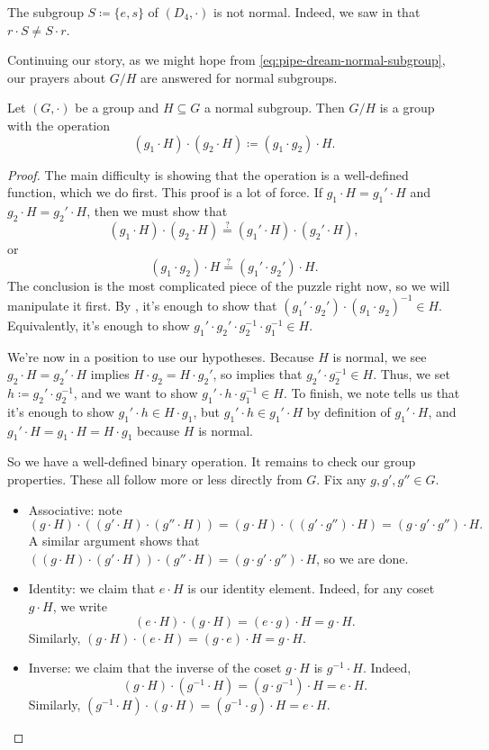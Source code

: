 \documentclass[../main.tex]{subfiles}
\begin{document}
\begin{nex}
    The subgroup $S\coloneqq\{e,s\}$ of $(D_4,\cdot)$ is not normal. Indeed, we saw in  that $r\cdot S\ne S\cdot r$.
\end{nex}
Continuing our story, as we might hope from \eqref{eq:pipe-dream-normal-subgroup}, our prayers about $G/H$ are answered for normal subgroups.
\begin{proposition}
    Let $(G,\cdot)$ be a group and $H\subseteq G$ a normal subgroup. Then $G/H$ is a group with the operation
    \[(g_1\cdot H)\cdot(g_2\cdot H)\coloneqq(g_1\cdot g_2)\cdot H.\]
\end{proposition}
\begin{proof}
    The main difficulty is showing that the operation is a well-defined function, which we do first. This proof is a lot of force. If $g_1\cdot H=g_1'\cdot H$ and $g_2\cdot H=g_2'\cdot H$, then we must show that
    \[(g_1\cdot H)\cdot(g_2\cdot H)\stackrel?=(g_1'\cdot H)\cdot(g_2'\cdot H),\]
    or
    \[(g_1\cdot g_2)\cdot H\stackrel?=(g_1'\cdot g_2')\cdot H.\]
    The conclusion is the most complicated piece of the puzzle right now, so we will manipulate it first. By , it's enough to show that $(g_1'\cdot g_2')\cdot(g_1\cdot g_2)^{-1}\in H$. Equivalently, it's enough to show $g_1'\cdot g_2'\cdot g_2^{-1}\cdot g_1^{-1}\in H$.
    
    We're now in a position to use our hypotheses. Because $H$ is normal, we see $g_2\cdot H=g_2'\cdot H$ implies $H\cdot g_2=H\cdot g_2'$, so  implies that $g_2'\cdot g_2^{-1}\in H$. Thus, we set $h\coloneqq g_2'\cdot g_2^{-1}$, and we want to show $g_1'\cdot h\cdot g_1^{-1}\in H$. To finish, we note  tells us that it's enough to show $g_1'\cdot h\in H\cdot g_1$, but $g_1'\cdot h\in g_1'\cdot H$ by definition of $g_1'\cdot H$, and $g_1'\cdot H=g_1\cdot H=H\cdot g_1$ because $H$ is normal.
    
    So we have a well-defined binary operation. It remains to check our group properties. These all follow more or less directly from $G$. Fix any $g,g',g''\in G$.
    \begin{itemize}
        \item Associative: note
        \[(g\cdot H)\cdot((g'\cdot H)\cdot(g''\cdot H))=(g\cdot H)\cdot((g'\cdot g'')\cdot H)=(g\cdot g'\cdot g'')\cdot H.\]
        A similar argument shows that $((g\cdot H)\cdot(g'\cdot H))\cdot(g''\cdot H)=(g\cdot g'\cdot g'')\cdot H$, so we are done.
        \item Identity: we claim that $e\cdot H$ is our identity element. Indeed, for any coset $g\cdot H$, we write
        \[(e\cdot H)\cdot(g\cdot H)=(e\cdot g)\cdot H=g\cdot H.\]
        Similarly, $(g\cdot H)\cdot(e\cdot H)=(g\cdot e)\cdot H=g\cdot H$.
        \item Inverse: we claim that the inverse of the coset $g\cdot H$ is $g^{-1}\cdot H$. Indeed,
        \[(g\cdot H)\cdot\left(g^{-1}\cdot H\right)=\left(g\cdot g^{-1}\right)\cdot H=e\cdot H.\]
        Similarly, $\left(g^{-1}\cdot H\right)\cdot(g\cdot H)=\left(g^{-1}\cdot g\right)\cdot H=e\cdot H$.
        \qedhere
    \end{itemize}
\end{proof}
\end{document}
